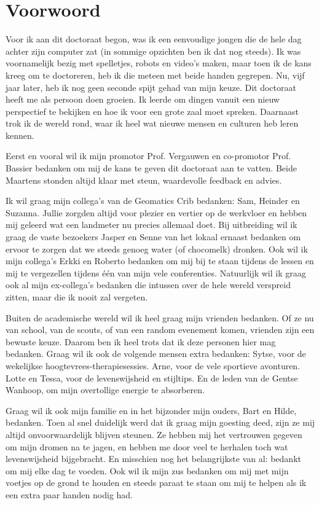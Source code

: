 \chapter*{Voorwoord}                                  \label{ch:preface}

Voor ik aan dit doctoraat begon, was ik een eenvoudige jongen die de hele dag achter zijn computer zat (in sommige opzichten ben ik dat nog steeds). Ik was voornamelijk bezig met spelletjes, robots en video's maken, maar toen ik de kans kreeg om te doctoreren, heb ik die meteen met beide handen gegrepen. Nu, vijf jaar later, heb ik nog geen seconde spijt gehad van mijn keuze. Dit doctoraat heeft me als persoon doen groeien. Ik leerde om dingen vanuit een nieuw perspectief te bekijken en hoe ik voor een grote zaal moet spreken. Daarnaast trok ik de wereld rond, waar ik heel wat nieuwe mensen en culturen heb leren kennen.

Eerst en vooral wil ik mijn promotor Prof. Vergauwen en co-promotor Prof. Bassier bedanken om mij de kans te geven dit doctoraat aan te vatten. Beide Maartens stonden altijd klaar met steun, waardevolle feedback en advies.

Ik wil graag mijn collega's van de Geomatics Crib bedanken: Sam, Heinder en Suzanna. Jullie zorgden altijd voor plezier en vertier op de werkvloer en hebben mij geleerd wat een landmeter nu precies allemaal doet. Bij uitbreiding wil ik graag de vaste bezoekers Jasper en Senne van het lokaal ernaast bedanken om ervoor te zorgen dat we steeds genoeg water (of chocomelk) dronken. Ook wil ik mijn collega's Erkki en Roberto bedanken om mij bij te staan tijdens de lessen en mij te vergezellen tijdens één van mijn vele conferenties. Natuurlijk wil ik graag ook al mijn ex-collega's bedanken die intussen over de hele wereld verspreid zitten, maar die ik nooit zal vergeten.

Buiten de academische wereld wil ik heel graag mijn vrienden bedanken. Of ze nu van school, van de scouts, of van een random evenement komen, vrienden zijn een bewuste keuze. Daarom ben ik heel trots dat ik deze personen hier mag bedanken. Graag wil ik ook de volgende mensen extra bedanken: Sytse, voor de wekelijkse hoogtevrees-therapiesessies. Arne, voor de vele sportieve avonturen. Lotte en Tessa, voor de levenswijsheid en stijltips. En de leden van de Gentse Wanhoop, om mijn overtollige energie te absorberen.

Graag wil ik ook mijn familie en in het bijzonder mijn ouders, Bart en Hilde, bedanken. Toen al snel duidelijk werd dat ik graag mijn goesting deed, zijn ze mij altijd onvoorwaardelijk blijven steunen. Ze hebben mij het vertrouwen gegeven om mijn dromen na te jagen, en hebben me door veel te herhalen toch wat levenswijsheid bijgebracht. En misschien nog het belangrijkste van al: bedankt om mij elke dag te voeden. Ook wil ik mijn zus bedanken om mij met mijn voetjes op de grond te houden en steeds paraat te staan om mij te helpen als ik een extra paar handen nodig had.

